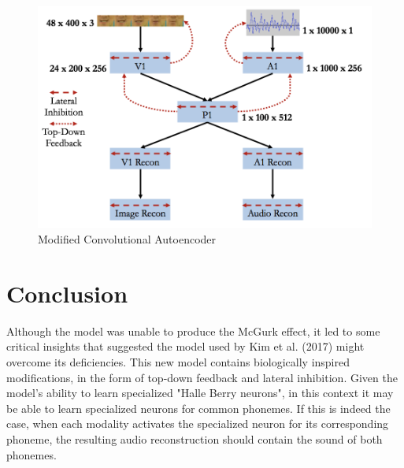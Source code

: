 \documentclass[conference]{IEEEtran}
\begin{document}
\begin{figure}[!t]
\centering
\includegraphics[scale=0.7]{modifiedmodel}
\caption{Modified Convolutional Autoencoder}
\label{fig:modified}
\end{figure}

\section{Conclusion}
Although the model was unable to produce the McGurk effect, it led to some critical insights that suggested the model used by Kim et al. (2017) might overcome its deficiencies. This new model contains biologically inspired modifications, in the form of top-down feedback and lateral inhibition. Given the model's ability to learn specialized "Halle Berry neurons", in this context it may be able to learn specialized neurons for common phonemes. If this is indeed the case, when each modality activates the specialized neuron for its corresponding phoneme, the resulting audio reconstruction should contain the sound of both phonemes.





%




\end{document}

